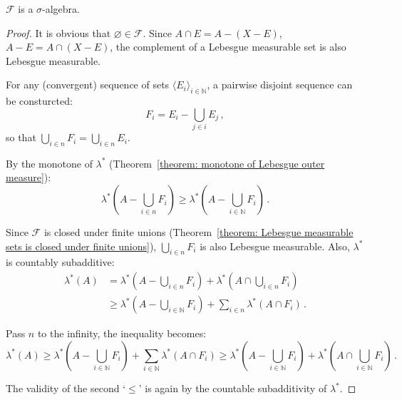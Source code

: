 \documentclass[openany]{book}
\begin{document}
\begin{theorem}
	\label{theorem: Lebesgue measurable sets are sigma-algebra}
	$\mathscr F$ is a $\sigma$-algebra.
\end{theorem}
\begin{proof}
	It is obvious that $\varnothing \in \mathscr F$.
	Since $A \cap E = A - (X - E)$, $A - E = A \cap (X - E)$, the complement of a Lebesgue measurable set is also Lebesgue measurable.

	For any (convergent) sequence of sets $\langle E_i \rangle_{i \in \mathbb N}$, a pairwise disjoint sequence can be consturcted:
	\begin{equation*}
		F_i = E_i - \bigcup_{j \in i} E_j\,,
	\end{equation*}
	so that $\bigcup_{i \in n} F_i = \bigcup_{i \in n} E_i$.

	By the monotone of $\lambda^*$ (Theorem~\ref{theorem: monotone of Lebesgue outer measure}):
	\begin{equation*}
		\lambda^* \left( A - \bigcup_{i \in n} F_i \right) 
			\geq \lambda^* \left( A - \bigcup_{i \in \mathbb N} F_i \right)\,.
	\end{equation*}

	Since $\mathscr F$ is closed under finite unions%
		(Theorem~\ref{theorem: Lebesgue measurable sets is closed under finite unions}), 
	$\bigcup_{i \in n} F_i$ is also Lebesgue measurable.
	Also, $\lambda^*$ is countably subadditive:
	\begin{align*}
		\lambda^*(A) 
		&= \lambda^*\left( A - \bigcup_{i \in n} F_i \right) 
			+  \lambda^*\left( A \cap \bigcup_{i \in n} F_i \right)
		\\
		&\geq  \lambda^* \left( A - \bigcup_{i \in \mathbb N} F_i \right) 
			+ \sum_{i \in n} \lambda^* (A \cap F_i)\,. 
	\end{align*}

	Pass $n$ to the infinity, the inequality becomes:
	\begin{equation*}
		\lambda^*(A) 
		\geq  \lambda^* \left( A - \bigcup_{i \in \mathbb N} F_i \right) 
			+ \sum_{i \in \mathbb N} \lambda^* (A \cap F_i)
		\geq \lambda^* \left( A - \bigcup_{i \in \mathbb N} F_i \right) 
		+ \lambda^* \left( A \cap \bigcup_{i \in \mathbb N} F_i \right) \,.
	\end{equation*}

	The validity of the second `$\leq$' is again by the countable subadditivity of $\lambda^*$.
\end{proof}
\end{document}
